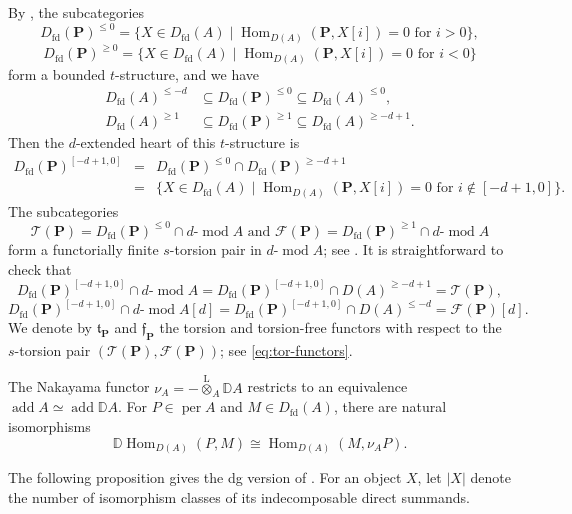\documentclass[11pt,a4paper,reqno]{amsart}
\theoremstyle{plain}
\numberwithin{equation}{section}
\theoremstyle{definition}
\providecommand{\add}{\operatorname{add}}
\providecommand{\per}{\operatorname{per}}
\renewcommand{\mod}{\operatorname{mod}}
\newcommand{\Hom}{\operatorname{Hom}}
\newcommand{\Lotimes}{\overset{\mathrm L}{\otimes}}
\newcommand{\emod}[2]{#1\text{-}\!\mod #2}
\newcommand{\eheart}[2]{#2^{[-#1+1,0]}}
\newcommand{\PP}{\mathbf{P}}
\newcommand{\T}{\mathcal{T}}
\newcommand{\F}{\mathcal{F}}
\begin{document}
By \cite[Proposition~2.1]{WZ}, the subcategories
\[
 D_{\mathrm{fd}}(\PP)^{\leq0}
 =\{X\in D_{\mathrm{fd}}(A)\mid
       \Hom_{D(A)}(\PP,X[i])=0\text{ for }i>0\},
\]
\[
 D_{\mathrm{fd}}(\PP)^{\geq0}
 =\{X\in D_{\mathrm{fd}}(A)\mid
       \Hom_{D(A)}(\PP,X[i])=0\text{ for }i<0\}
\]
form a bounded $t$-structure, and we have
\begin{equation}\label{eq:silt-inc}
\begin{aligned}
 D_{\mathrm{fd}}(A)^{\leq-d}
 &\subseteq D_{\mathrm{fd}}(\PP)^{\leq0}
 \subseteq D_{\mathrm{fd}}(A)^{\leq0},\\
 D_{\mathrm{fd}}(A)^{\geq1}
 &\subseteq D_{\mathrm{fd}}(\PP)^{\geq1}
 \subseteq D_{\mathrm{fd}}(A)^{\geq-d+1}.
\end{aligned}
\end{equation}
Then the $d$-extended heart of this $t$-structure is
\[\begin{array}{rcl}
  \eheart{d}{D_{\mathrm{fd}}(\PP)} & = & D_{\mathrm{fd}}(\PP)^{\leq 0}\cap D_{\mathrm{fd}}(\PP)^{\geq -d+1}\\
  & = & \{X\in D_{\mathrm{fd}}(A)\mid \Hom_{D(A)}(\PP,X[i])=0\text{ for }i\notin[-d+1,0]\}.
\end{array}
\]
The subcategories
\[
 \T(\PP)=D_{\mathrm{fd}}(\PP)^{\leq0}\cap\emod{d}{A}\text{ and }
 \F(\PP)=D_{\mathrm{fd}}(\PP)^{\geq1}\cap\emod{d}{A}
\]
form a functorially finite $s$-torsion pair in $\emod{d}{A}$; see \cite[Corollary~4.1]{HZ}. It is straightforward to check that 
\[\eheart{d}{D_{\mathrm{fd}}(\PP)}\cap\emod{d}{A}=\eheart{d}{D_{\mathrm{fd}}(\PP)}\cap D(A)^{\geq -d+1}=\T(\PP),\]
\[\eheart{d}{D_{\mathrm{fd}}(\PP)}\cap\emod{d}{A}[d]=\eheart{d}{D_{\mathrm{fd}}(\PP)}\cap D(A)^{\leq -d}=\F(\PP)[d].\]
We denote by $\mathfrak{t}_{\PP}$ and $\mathfrak{f}_{\PP}$ the torsion and torsion-free functors with respect to the $s$-torsion pair $(\T(\PP),\F(\PP))$; see \eqref{eq:tor-functors}.

The Nakayama functor $\nu_A=-\Lotimes_A\mathbb D A$ restricts to an equivalence $\add A\simeq\add\mathbb D A$. For $P\in\per A$ and $M\in D_{\mathrm{fd}}(A)$, there are natural isomorphisms
\begin{equation}\label{eq:Serre}
 \mathbb D\Hom_{D(A)}(P,M)
 \cong\Hom_{D(A)}(M,\nu_A P).
\end{equation}

The following proposition gives the dg version of \cite[Proposition~2.14 and Corollary~4.13]{Z}. For an object $X$, let $|X|$ denote the number of isomorphism classes of its indecomposable direct summands.
\end{document}
